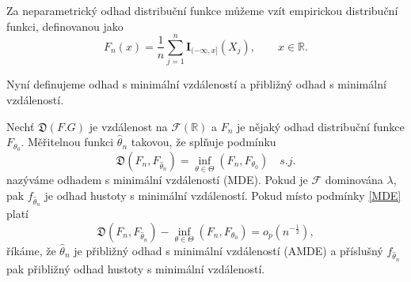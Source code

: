 \noindent Za neparametrický odhad distribuční funkce můžeme vzít empirickou distribuční funkci, definovanou jako
\begin{equation}
F_n(x)=\frac{1}{n}\sum_{j=1}^n \textbf{I}_{(-\infty,x]}(X_j), \qquad x\in\mathbb{R}.
\end{equation}
%
%

\noindent Nyní definujeme odhad s minimální vzdáleností a přibližný odhad s minimální vzdáleností.

\begin{definition}\label{def-mde}
	Nech\v{t} $\mathfrak{D}(F.G)$ je vzdálenost na $\mathcal{F}(\mathbb{R})$ a $F_n$ je nějaký odhad distribuční funkce $F_{\theta_0}$. Měřitelnou funkci $\hat{\theta}_n$ takovou, že spl\v{n}uje podmínku
	\begin{equation}
		\mathfrak{D}(F_n, F_{\hat{\theta}_n}) = \inf_{\theta \in \Theta}(F_n, F_{\theta_0}) \quad s.j.
		\label{MDE}
	\end{equation}
	nazýváme odhadem s minimální vzdáleností (MDE). Pokud je $\mathcal{F}$ dominována $\lambda$, pak $f_{\hat{\theta}_n}$  je odhad hustoty s minimální vzdáleností. Pokud místo podmínky \eqref{MDE} platí 
	\begin{equation}
		\mathfrak{D}(F_n, F_{\hat{\theta}_n}) - \inf_{\theta \in \Theta}(F_n, F_{\theta_0}) = o_p(n^{-\frac{1}{2}}), 
	\end{equation}
	říkáme, že $\hat{\theta}_n$ je přibližný odhad s minimální vzdáleností (AMDE) a příslušný  $f_{\hat{\theta}_n}$ pak přibližný odhad hustoty s minimální vzdáleností.
\end{definition}



